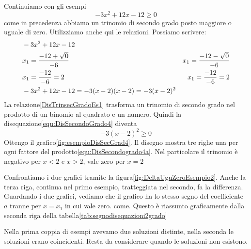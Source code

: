 Continuiamo con gli esempi
\begin{equation}
-3x^2+12x-12\geq 0\label{equ:DisSecondoGrado4}
\end{equation} 
come in precedenza abbiamo un trinomio di secondo grado  posto maggiore o uguale di zero.  Utilizziamo anche qui le relazioni\nobs{}.
Possiamo scrivere:
\begin{align}
&-3x^2+12x-12\\
&x_{1}=\dfrac{-12+\sqrt{0}}{-6}\notag
&x_{1}=\dfrac{-12-\sqrt{0}}{-6}\notag\\
&x_{1}=\dfrac{-12}{-6}=2\notag
&x_{1}=\dfrac{-12}{-6}=2\notag\\
&-3x^2+12x-12=-3(x-2)(x-2)=-3(x-2)^2\label{DisTrinsecGradoEs4}
\end{align}
La relazione\nobs\vref{DisTrinsecGradoEs1} trasforma un trinomio di secondo grado nel prodotto di un binomio al quadrato e un numero. Quindi la disequazione\nobs\vref{equ:DisSecondoGrado4} diventa 
\begin{equation}
-3(x-2)^2\geq 0\label{equ:DisSecondogrado4a}
\end{equation} 
Ottengo il grafico\nobs\vref{fig:esempioDisSecGrad4}. Il disegno mostra tre righe una per ogni fattore del prodotto\nobs\vref{equ:DisSecondogrado4a}. Nel particolare il trinomio è negativo per $x<2$ e $x>2$, vale zero  per $x=2$

Confrontiamo i due grafici tramite la figura\nobs\vref{fig:DeltaUguZeroEsempio2}. Anche  la terza  riga, continua nel primo esempio, tratteggiata nel secondo, fa la differenza. Guardando i due grafici, vediamo che il grafico ha lo stesso segno del coefficiente $a$ tranne per $x=x_1$ in cui vale zero.  come\nobs{}. Questo è riassunto graficamente dalla seconda riga della tabella\nobs\vref{tab:segnodisequazioni2grado}

Nella prima coppia di esempi avevamo due soluzioni distinte, nella seconda le soluzioni erano coincidenti. Resta da considerare quando le soluzioni non esistono.

